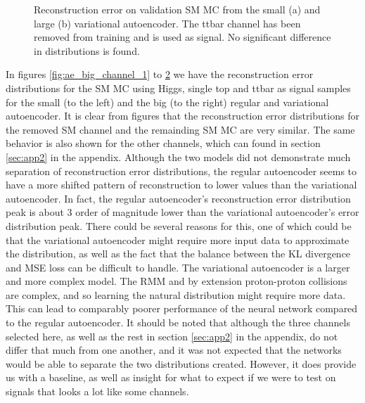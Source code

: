 \begin{figure}[H]
\begin{subfigure}{.45\textwidth}
        \caption{ }
        \label{fig:vae_big_ttbar}
    \end{subfigure}
    \hfill 
    \caption[VAE | Reconstruction error using ttbar channel as signal]{Reconstruction error on validation SM MC from the small (a) and large (b) variational autoencoder. The ttbar channel has been removed from training and 
    is used as signal. No significant difference in distributions is found.  }
    \label{fig:vae_big_channel_3}
\end{figure}

In figures \ref{fig:ae_big_channel_1} to \ref{fig:vae_big_channel_3} we have the reconstruction error distributions for the SM MC using 
Higgs, single top and ttbar as signal samples for the small (to the left) and the big (to the right) regular and variational autoencoder. 
It is clear from figures that the reconstruction error distributions for the removed SM channel and the remainding SM MC are very similar. 
The same behavior is also shown for the other channels, which can found in section \ref{sec:app2} in the appendix. Although the two models did not demonstrate much separation
of reconstruction error distributions, the regular autoencoder seems to have a more shifted pattern of reconstruction to lower 
values than the variational autoencoder. In fact, the regular autoencoder's reconstruction error distribution peak is about 3 order of 
magnitude lower than the variational autoencoder's error distribution peak. There could be several reasons for this, one of which could be that 
the variational autoencoder might require more input data to approximate the distribution, as well as the fact that the balance between the KL divergence and MSE loss 
can be difficult to handle\cite{kl_mse_balance}. The variational autoencoder is a larger and more complex model. The RMM and by extension proton-proton collisions 
are complex, and so learning the natural distribution might require more data. This can lead to comparably poorer performance of the neural network compared to the regular autoencoder. 
It should be noted that although the three channels selected here, as well as the rest in section \ref{sec:app2} in the appendix, do not differ that much from one another, and it was not expected that the networks 
would be able to separate the two distributions created. However, it does provide us with a baseline, as well as insight for what 
to expect if we were to test on signals that looks a lot like some channels. 


\newpage


